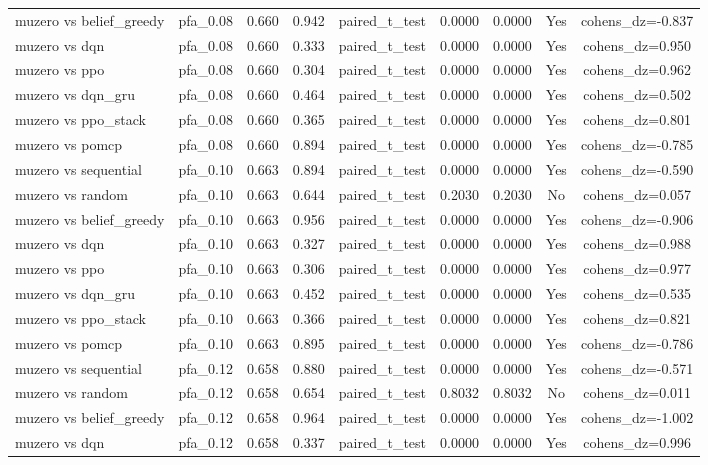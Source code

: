 \begin{table}[htbp]
\begin{tabular}{lcccccccc}
muzero vs belief_greedy & pfa_0.08 & 0.660 & 0.942 & paired_t_test & 0.0000 & 0.0000 & Yes & cohens_dz=-0.837 \\
muzero vs dqn & pfa_0.08 & 0.660 & 0.333 & paired_t_test & 0.0000 & 0.0000 & Yes & cohens_dz=0.950 \\
muzero vs ppo & pfa_0.08 & 0.660 & 0.304 & paired_t_test & 0.0000 & 0.0000 & Yes & cohens_dz=0.962 \\
muzero vs dqn_gru & pfa_0.08 & 0.660 & 0.464 & paired_t_test & 0.0000 & 0.0000 & Yes & cohens_dz=0.502 \\
muzero vs ppo_stack & pfa_0.08 & 0.660 & 0.365 & paired_t_test & 0.0000 & 0.0000 & Yes & cohens_dz=0.801 \\
muzero vs pomcp & pfa_0.08 & 0.660 & 0.894 & paired_t_test & 0.0000 & 0.0000 & Yes & cohens_dz=-0.785 \\
muzero vs sequential & pfa_0.10 & 0.663 & 0.894 & paired_t_test & 0.0000 & 0.0000 & Yes & cohens_dz=-0.590 \\
muzero vs random & pfa_0.10 & 0.663 & 0.644 & paired_t_test & 0.2030 & 0.2030 & No & cohens_dz=0.057 \\
muzero vs belief_greedy & pfa_0.10 & 0.663 & 0.956 & paired_t_test & 0.0000 & 0.0000 & Yes & cohens_dz=-0.906 \\
muzero vs dqn & pfa_0.10 & 0.663 & 0.327 & paired_t_test & 0.0000 & 0.0000 & Yes & cohens_dz=0.988 \\
muzero vs ppo & pfa_0.10 & 0.663 & 0.306 & paired_t_test & 0.0000 & 0.0000 & Yes & cohens_dz=0.977 \\
muzero vs dqn_gru & pfa_0.10 & 0.663 & 0.452 & paired_t_test & 0.0000 & 0.0000 & Yes & cohens_dz=0.535 \\
muzero vs ppo_stack & pfa_0.10 & 0.663 & 0.366 & paired_t_test & 0.0000 & 0.0000 & Yes & cohens_dz=0.821 \\
muzero vs pomcp & pfa_0.10 & 0.663 & 0.895 & paired_t_test & 0.0000 & 0.0000 & Yes & cohens_dz=-0.786 \\
muzero vs sequential & pfa_0.12 & 0.658 & 0.880 & paired_t_test & 0.0000 & 0.0000 & Yes & cohens_dz=-0.571 \\
muzero vs random & pfa_0.12 & 0.658 & 0.654 & paired_t_test & 0.8032 & 0.8032 & No & cohens_dz=0.011 \\
muzero vs belief_greedy & pfa_0.12 & 0.658 & 0.964 & paired_t_test & 0.0000 & 0.0000 & Yes & cohens_dz=-1.002 \\
muzero vs dqn & pfa_0.12 & 0.658 & 0.337 & paired_t_test & 0.0000 & 0.0000 & Yes & cohens_dz=0.996 \\

\end{tabular}
\end{table}
